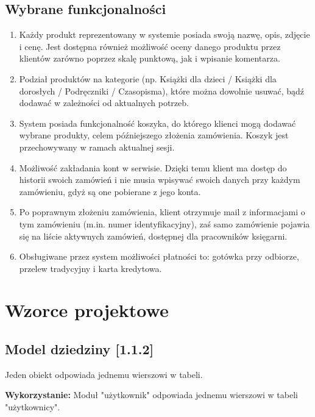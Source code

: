 \documentclass[pdflatex,11pt]{aghdpl}
\begin{document}
\clearpage


\section{Wybrane funkcjonalności}

\begin{enumerate}
\item Każdy produkt reprezentowany w systemie posiada swoją nazwę, opis, zdjęcie i cenę. Jest dostępna również możliwość oceny danego produktu przez klientów zarówno poprzez skalę punktową, jak i wpisanie komentarza.
\item Podział produktów na kategorie (np. Książki dla dzieci / Książki dla dorosłych / Podręczniki / Czasopisma), które można dowolnie usuwać, bądź dodawać w zależności od aktualnych potrzeb.
\item System posiada funkcjonalność koszyka, do którego klienci mogą dodawać wybrane produkty, celem późniejszego złożenia zamówienia. Koszyk jest przechowywany w ramach aktualnej sesji.
\item Możliwość zakładania kont w serwisie. Dzięki temu klient ma dostęp do historii swoich zamówień i nie musia wpisywać swoich danych przy każdym zamówieniu, gdyż są one pobierane z jego konta.
\item Po poprawnym złożeniu zamówienia, klient otrzymuje mail z informacjami o tym zamówieniu (m.in. numer identyfikacyjny), zaś samo zamówienie pojawia się na liście aktywnych zamówień, dostępnej dla pracowników księgarni.
\item Obsługiwane przez system możliwości płatności to: gotówka przy odbiorze, przelew tradycyjny i karta kredytowa.
\end{enumerate}



\chapter{Wzorce projektowe}

\section{Model dziedziny [1.1.2]}

Jeden obiekt odpowiada jednemu wierszowi w tabeli.

\textbf{Wykorzystanie:} Moduł "użytkownik" odpowiada jednemu wierszowi w tabeli "użytkownicy".
\end{document}
